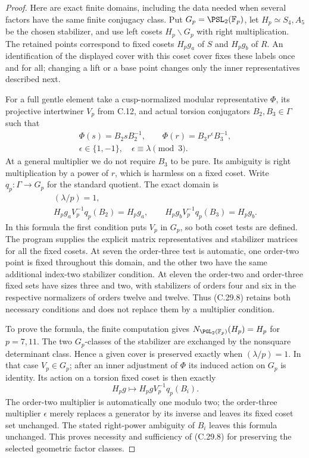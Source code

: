 \begin{proof}
Here are exact finite domains, including the data
needed when several factors have the same finite
conjugacy class. Put $G_p=\PSL_2(\mathbb F_p)$,
let $H_p\simeq S_4,A_5$ be the chosen stabilizer,
and use left cosets $H_p\backslash G_p$ with
right multiplication. The retained points correspond
to fixed cosets $H_pg_a$ of $S$ and $H_pg_b$ of
$R$. An identification of the displayed cover with
this coset cover fixes these labels once and for all;
changing a lift or a base point changes only the
inner representatives described next.

For a full gentle element take a cusp-normalized
modular representative $\Phi$, its projective
intertwiner $V_p$ from C.12, and actual torsion
conjugators $B_2,B_3\in\Gamma$ such that
\[
 \begin{gathered}
 \Phi(s)=B_2sB_2^{-1},\qquad
 \Phi(r)=B_3r^\epsilon B_3^{-1},\\
                    \epsilon\in\{1,-1\},\quad
                    \epsilon\equiv\lambda\pmod3.
 \end{gathered}
\]
At a general multiplier we do not require $B_3$
to be pure. Its ambiguity is right multiplication
by a power of $r$, which is harmless on a fixed
coset. Write $q_p:\Gamma\to G_p$ for the
standard quotient. The exact domain is
\[
 \begin{gathered}
 (\lambda/p)=1,\\
 H_pg_aV_p^{-1}q_p(B_2)=H_pg_a,\qquad
 H_pg_bV_p^{-1}q_p(B_3)=H_pg_b .
 \end{gathered}
 \tag{C.29.8}
\]
In this formula the first condition puts $V_p$
in $G_p$, so both coset tests are defined.
The program supplies the explicit matrix representatives
and stabilizer matrices for all the fixed cosets.
At seven the order-three test is automatic, one
order-two point is fixed throughout this domain,
and the other two have the same additional
index-two stabilizer condition. At eleven the
order-two and order-three fixed sets have sizes
three and two, with stabilizers of orders four
and six in the respective normalizers of orders
twelve and twelve. Thus (C.29.8) retains both
necessary conditions and does not replace them
by a multiplier condition.

To prove the formula, the finite computation gives
$N_{\PGL_2(\mathbb F_p)}(H_p)=H_p$ for $p=7,11$.
The two $G_p$-classes of the stabilizer are exchanged
by the nonsquare determinant class. Hence a given
cover is preserved exactly when $(\lambda/p)=1$.
In that case $V_p\in G_p$; after an inner adjustment
of $\Phi$ its induced action on $G_p$ is identity.
Its action on a torsion fixed coset is then exactly
\[
       H_pg\longmapsto H_pgV_p^{-1}q_p(B_i).
\]
The order-two multiplier is automatically one modulo
two; the order-three multiplier $\epsilon$ merely
replaces a generator by its inverse and leaves its
fixed coset set unchanged. The stated right-power
ambiguity of $B_i$ leaves this formula unchanged.
This proves necessity and sufficiency of (C.29.8)
for preserving the selected geometric factor classes.


\end{proof}
